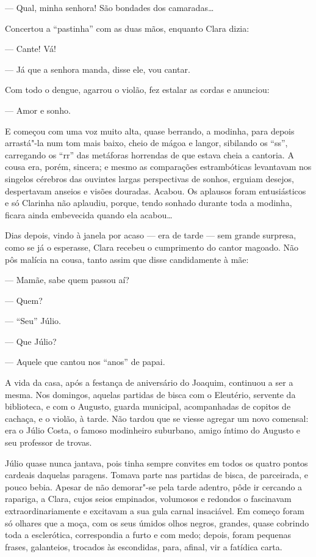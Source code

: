 --- Qual, minha senhora! São bondades dos camaradas\ldots{}

Concertou a ``pastinha'' com as duas mãos, enquanto Clara dizia:

--- Cante! Vá!

--- Já que a senhora manda, disse ele, vou cantar.

Com todo o dengue, agarrou o violão, fez estalar as cordas e anunciou:

--- Amor e sonho.

E começou com uma voz muito alta, quase berrando, a modinha, para depois
arrastá"-la num tom mais baixo, cheio de mágoa e langor, sibilando os
``ss'', carregando os ``rr'' das metáforas horrendas de que estava cheia a
cantoria. A cousa era, porém, sincera; e mesmo as comparações
estrambóticas levantavam nos singelos cérebros das ouvintes largas
perspectivas de sonhos, erguiam desejos, despertavam anseios e visões
douradas. Acabou. Os aplausos foram entusiásticos e só Clarinha não
aplaudiu, porque, tendo sonhado durante toda a modinha, ficara ainda
embevecida quando ela acabou\ldots{}

Dias depois, vindo à janela por acaso --- era de tarde --- sem grande
surpresa, como se já o esperasse, Clara recebeu o cumprimento do cantor
magoado. Não pôs malícia na cousa, tanto assim que disse candidamente à
mãe:

--- Mamãe, sabe quem passou aí?

--- Quem?

--- ``Seu'' Júlio.

--- Que Júlio?

--- Aquele que cantou nos ``anos'' de papai.

A vida da casa, após a festança de aniversário do Joaquim, continuou a
ser a mesma. Nos domingos, aquelas partidas de bisca com o Eleutério,
servente da biblioteca, e com o Augusto, guarda municipal, acompanhadas
de copitos de cachaça, e o violão, à tarde. Não tardou que se viesse
agregar um novo comensal: era o Júlio Costa, o famoso modinheiro
suburbano, amigo íntimo do Augusto e seu professor de trovas.

Júlio quase nunca jantava, pois tinha sempre convites em todos os quatro
pontos cardeais daquelas paragens. Tomava parte nas partidas de bisca,
de parceirada, e pouco bebia. Apesar de não demorar"-se pela tarde
adentro, pôde ir cercando a rapariga, a Clara, cujos seios empinados,
volumosos e redondos o fascinavam extraordinariamente e excitavam a sua
gula carnal insaciável. Em começo foram só olhares que a moça, com os
seus úmidos olhos negros, grandes, quase cobrindo toda a esclerótica,
correspondia a furto e com medo; depois, foram pequenas frases,
galanteios, trocados às escondidas, para, afinal, vir a fatídica carta.

